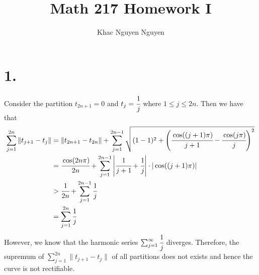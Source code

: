 \documentclass[11pt]{article}
\title{\textbf{Math 217 Homework I}}
\author{Khac Nguyen Nguyen}
\date{}
\begin{document}
\section*{1.}
Consider the partition $t_{2n+1} = 0$ and $t_j = \cfrac{1}{j}$ where $1 \le j \le 2n$. Then we have that 
\begin{equation*}
    \begin{aligned}
        \sum_{j=1}^{2n} \| t_{j+1} - t_j \| 
        &= \| t_{2n+1} - t_{2n} \| + \sum_{j=1}^{2n-1} \sqrt{(1-1)^2 + \left(\cfrac{\cos((j+1) \pi)}{j+1} - \cfrac{\cos(j \pi)}{j} \right)^2} \\
        &= \cfrac{\cos(2n \pi)}{2n} + \sum_{j=1}^{2n-1} \left| \cfrac{1}{j+1} + \cfrac{1}{j} \right| \cdot | \cos((j+1)\pi) | \\
        &> \cfrac{1}{2n} + \sum_{j=1}^{2n-1} \cfrac{1}{j} \\
        &= \sum_{j=1}^{2n} \cfrac{1}{j}
    \end{aligned}
\end{equation*}
However, we know that the harmonic series $\sum_{j=1}^\infty \cfrac{1}{j}$ diverges. Therefore, the supremum
of $\sum_{j=1}^{2n} \|t_{j+1} - t_j \|$ of all partitions does not exists and hence the curve is not rectifiable.
\pagebreak
\end{document}

